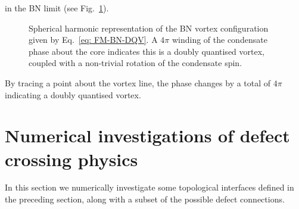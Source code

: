 in the BN limit (see Fig.~\ref{fig: BN-DQV}).
\begin{figure}
    \centering
    \caption[Spherical harmonic representation of a biaxial nematic doubly
        quantised vortex]
    {\label{fig: BN-DQV} Spherical harmonic
        representation of the BN vortex configuration given by
        Eq.~\eqref{eq: FM-BN-DQV}.
        A \(4\pi \) winding of the condensate phase about the core indicates
        this is a doubly quantised vortex, coupled with a non-trivial rotation
        of the condensate spin.}
\end{figure}
By tracing a point about the vortex line, the phase changes by a total of
\(4\pi \) indicating a doubly quantised vortex.

\section{Numerical investigations of defect crossing physics}
In this section we numerically investigate some topological interfaces defined
in the preceding section, along with a subset of the possible defect
connections.

